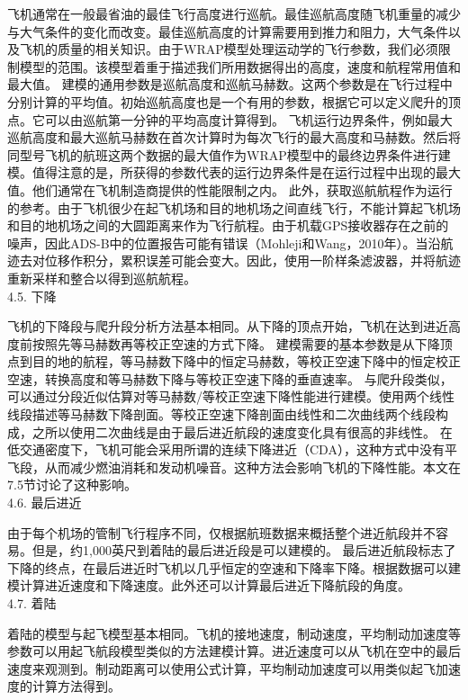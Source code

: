 \documentclass[a4paper,punct,space,heading=true,AutoFakeBold]{ctexrep}
\newcommand{\xiaosi}{\fontsize{12pt}{\baselineskip}\selectfont}
\begin{document}
飞机通常在一般最省油的最佳飞行高度进行巡航。最佳巡航高度随飞机重量的减少与大气条件的变化而改变。最佳巡航高度的计算需要用到推力和阻力，大气条件以及飞机的质量的相关知识。由于WRAP模型处理运动学的飞行参数，我们必须限制模型的范围。该模型着重于描述我们所用数据得出的高度，速度和航程常用值和最大值。
建模的通用参数是巡航高度和巡航马赫数。这两个参数是在飞行过程中分别计算的平均值。初始巡航高度也是一个有用的参数，根据它可以定义爬升的顶点。它可以由巡航第一分钟的平均高度计算得到。
飞机运行边界条件，例如最大巡航高度和最大巡航马赫数在首次计算时为每次飞行的最大高度和马赫数。然后将同型号飞机的航班这两个数据的最大值作为WRAP模型中的最终边界条件进行建模。值得注意的是，所获得的参数代表的运行边界条件是在运行过程中出现的最大值。他们通常在飞机制造商提供的性能限制之内。
此外，获取巡航航程作为运行的参考。由于飞机很少在起飞机场和目的地机场之间直线飞行，不能计算起飞机场和目的地机场之间的大圆距离来作为飞行航程。由于机载GPS接收器存在之前的噪声，因此ADS-B中的位置报告可能有错误（Mohleji和Wang，2010年）。当沿航迹去对位移作积分，累积误差可能会变大。因此，使用一阶样条滤波器，并将航迹重新采样和整合以得到巡航航程。\\
4.5. 下降

飞机的下降段与爬升段分析方法基本相同。从下降的顶点开始，飞机在达到进近高度前按照先等马赫数再等校正空速的方式下降。
建模需要的基本参数是从下降顶点到目的地的航程，等马赫数下降中的恒定马赫数，等校正空速下降中的恒定校正空速，转换高度和等马赫数下降与等校正空速下降的垂直速率。
与爬升段类似，可以通过分段近似估算对等马赫数/等校正空速下降性能进行建模。使用两个线性线段描述等马赫数下降剖面。等校正空速下降剖面由线性和二次曲线两个线段构成，之所以使用二次曲线是由于最后进近航段的速度变化具有很高的非线性。
在低交通密度下，飞机可能会采用所谓的连续下降进近（CDA），这种方式中没有平飞段，从而减少燃油消耗和发动机噪音。这种方法会影响飞机的下降性能。本文在7.5节讨论了这种影响。\\
4.6. 最后进近

由于每个机场的管制飞行程序不同，仅根据航班数据来概括整个进近航段并不容易。但是，约1,000英尺到着陆的最后进近段是可以建模的。
最后进近航段标志了下降的终点，在最后进近时飞机以几乎恒定的空速和下降率下降。根据数据可以建模计算进近速度和下降速度。此外还可以计算最后进近下降航段的角度。\\
4.7. 着陆

着陆的模型与起飞模型基本相同。飞机的接地速度，制动速度，平均制动加速度等参数可以用起飞航段模型类似的方法建模计算。进近速度可以从飞机在空中的最后速度来观测到。制动距离可以使用公式计算，平均制动加速度可以用类似起飞加速度的计算方法得到。

{
	\noindent\xiaosi\bfseries{}
}
\end{document}
